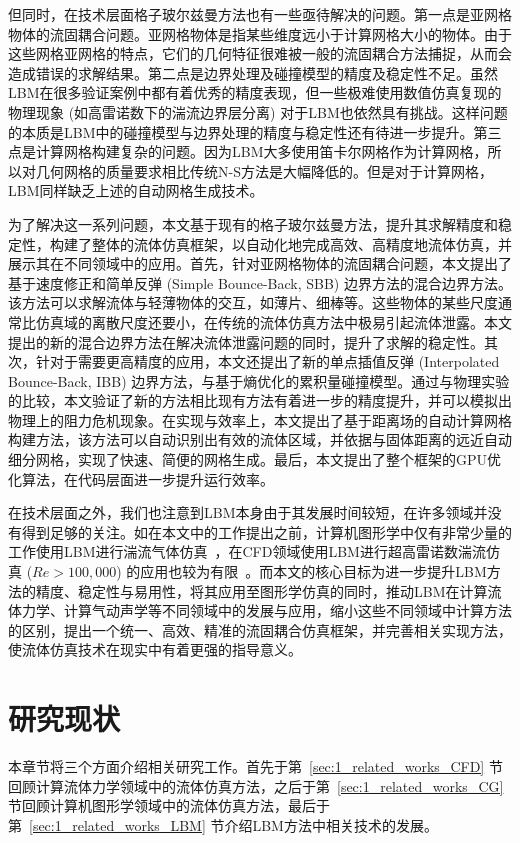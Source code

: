但同时，在技术层面格子玻尔兹曼方法也有一些亟待解决的问题。第一点是亚网格物体的流固耦合问题。亚网格物体是指某些维度远小于计算网格大小的物体。由于这些网格亚网格的特点，它们的几何特征很难被一般的流固耦合方法捕捉，从而会造成错误的求解结果。第二点是边界处理及碰撞模型的精度及稳定性不足。虽然LBM在很多验证案例中都有着优秀的精度表现，但一些极难使用数值仿真复现的物理现象 (如高雷诺数下的湍流边界层分离) 对于LBM也依然具有挑战。这样问题的本质是LBM中的碰撞模型与边界处理的精度与稳定性还有待进一步提升。第三点是计算网格构建复杂的问题。因为LBM大多使用笛卡尔网格作为计算网格，所以对几何网格的质量要求相比传统N-S方法是大幅降低的。但是对于计算网格，LBM同样缺乏上述的自动网格生成技术。

为了解决这一系列问题，本文基于现有的格子玻尔兹曼方法，提升其求解精度和稳定性，构建了整体的流体仿真框架，以自动化地完成高效、高精度地流体仿真，并展示其在不同领域中的应用。首先，针对亚网格物体的流固耦合问题，本文提出了基于速度修正和简单反弹 (Simple Bounce-Back, SBB) 边界方法的混合边界方法。该方法可以求解流体与轻薄物体的交互，如薄片、细棒等。这些物体的某些尺度通常比仿真域的离散尺度还要小，在传统的流体仿真方法中极易引起流体泄露。本文提出的新的混合边界方法在解决流体泄露问题的同时，提升了求解的稳定性。其次，针对于需要更高精度的应用，本文还提出了新的单点插值反弹 (Interpolated Bounce-Back, IBB) 边界方法，与基于熵优化的累积量碰撞模型。通过与物理实验的比较，本文验证了新的方法相比现有方法有着进一步的精度提升，并可以模拟出物理上的阻力危机现象。在实现与效率上，本文提出了基于距离场的自动计算网格构建方法，该方法可以自动识别出有效的流体区域，并依据与固体距离的远近自动细分网格，实现了快速、简便的网格生成。最后，本文提出了整个框架的GPU优化算法，在代码层面进一步提升运行效率。

在技术层面之外，我们也注意到LBM本身由于其发展时间较短，在许多领域并没有得到足够的关注。如在本文中的工作提出之前，计算机图形学中仅有非常少量的工作使用LBM进行湍流气体仿真~\citep{10.1109/TVCG.2012.303, Li-2019, Li-2020}，在CFD领域使用LBM进行超高雷诺数湍流仿真 ($Re>100,000$) 的应用也较为有限~\cite{10.1063/5.0046938}。而本文的核心目标为进一步提升LBM方法的精度、稳定性与易用性，将其应用至图形学仿真的同时，推动LBM在计算流体力学、计算气动声学等不同领域中的发展与应用，缩小这些不同领域中计算方法的区别，提出一个统一、高效、精准的流固耦合仿真框架，并完善相关实现方法，使流体仿真技术在现实中有着更强的指导意义。


\section{研究现状}
本章节将三个方面介绍相关研究工作。首先于第~\ref{sec:1_related_works_CFD} 节回顾计算流体力学领域中的流体仿真方法，之后于第~\ref{sec:1_related_works_CG} 节回顾计算机图形学领域中的流体仿真方法，最后于第~\ref{sec:1_related_works_LBM} 节介绍LBM方法中相关技术的发展。

